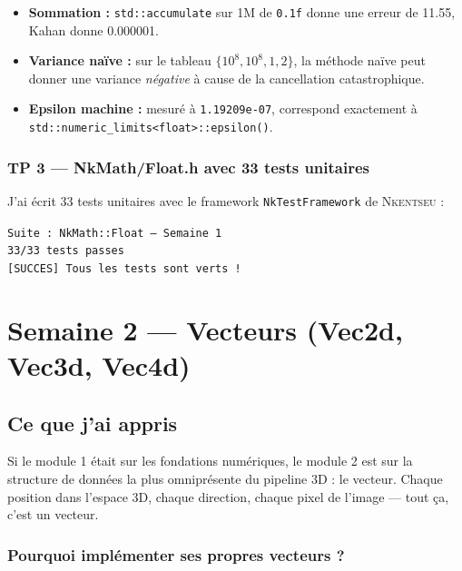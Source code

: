 \documentclass[12pt,a4paper]{report}
\newcommand{\code}[1]{\texttt{\textcolor{myblue}{#1}}}
\newcommand{\nkentseu}{\textsc{Nkentseu}}
\begin{document}
\begin{itemize}
    \item \textbf{Sommation :} \code{std::accumulate} sur 1M de \code{0.1f} donne une erreur de 11.55, Kahan donne 0.000001.
    \item \textbf{Variance naïve :} sur le tableau $\{10^8, 10^8, 1, 2\}$, la méthode naïve peut donner une variance \textit{négative} à cause de la cancellation catastrophique.
    \item \textbf{Epsilon machine :} mesuré à \code{1.19209e-07}, correspond exactement à \code{std::numeric\_limits<float>::epsilon()}.
\end{itemize}

\subsection{TP 3 — NkMath/Float.h avec 33 tests unitaires}

J'ai écrit 33 tests unitaires avec le framework \code{NkTestFramework} de \nkentseu{} :

\begin{resultbox}
\texttt{Suite : NkMath::Float — Semaine 1} \\
\texttt{33/33 tests passes} \\
\texttt{[SUCCES] Tous les tests sont verts !}
\end{resultbox}

\chapter{Semaine 2 — Vecteurs (Vec2d, Vec3d, Vec4d)}

\section{Ce que j'ai appris}

Si le module 1 était sur les fondations numériques, le module 2 est sur la structure de données la plus omniprésente du pipeline 3D : le vecteur. Chaque position dans l'espace 3D, chaque direction, chaque pixel de l'image — tout ça, c'est un vecteur.

\subsection{Pourquoi implémenter ses propres vecteurs ?}
\end{document}
